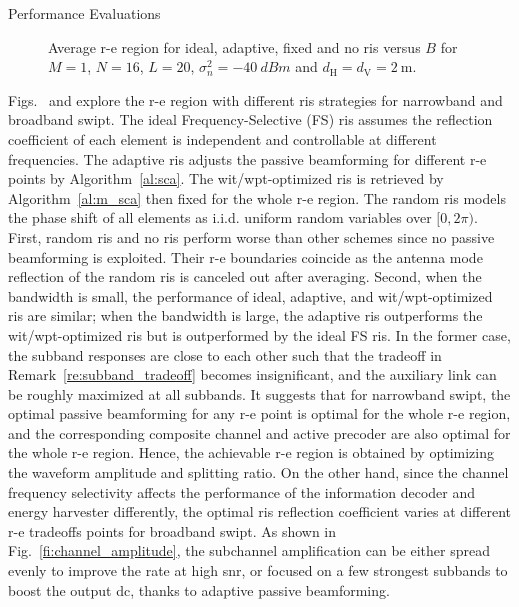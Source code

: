 \begin{section}{Performance Evaluations}
	\begin{figure}[!t]
		\centering
		\subfloat[$B=\qty{1}{\MHz}$\label{fi:re_irs_1mhz}]{
			\resizebox{0.45\columnwidth}{!}{
				
			}
		}
		\subfloat[$B=\qty{10}{\MHz}$\label{fi:re_irs_10mhz}]{
			\resizebox{0.45\columnwidth}{!}{
				
			}
		}
		\caption{Average \gls{r-e} region for ideal, adaptive, fixed and no \gls{ris} versus $B$ for $M=1$, $N=16$, $L=20$, $\sigma_n^2=\qty{-40}{dBm}$ and $d_{\mathrm{H}}=d_{\mathrm{V}}=\qty{2}{\meter}$.}
	\end{figure}

	Figs.~ and  explore the \gls{r-e} region with different \gls{ris} strategies for narrowband and broadband \gls{swipt}. The ideal Frequency-Selective (FS) \gls{ris} assumes the reflection coefficient of each element is independent and controllable at different frequencies. The adaptive \gls{ris} adjusts the passive beamforming for different \gls{r-e} points by Algorithm~\ref{al:sca}. The \gls{wit}/\gls{wpt}-optimized \gls{ris} is retrieved by Algorithm~\ref{al:m_sca} then fixed for the whole \gls{r-e} region. The random \gls{ris} models the phase shift of all elements as i.i.d. uniform random variables over $[0, 2\pi)$. First, random \gls{ris} and no \gls{ris} perform worse than other schemes since no passive beamforming is exploited. Their \gls{r-e} boundaries coincide as the antenna mode reflection of the random \gls{ris} is canceled out after averaging. Second, when the bandwidth is small, the performance of ideal, adaptive, and \gls{wit}/\gls{wpt}-optimized \gls{ris} are similar; when the bandwidth is large, the adaptive \gls{ris} outperforms the \gls{wit}/\gls{wpt}-optimized \gls{ris} but is outperformed by the ideal FS \gls{ris}. In the former case, the subband responses are close to each other such that the tradeoff in Remark~\ref{re:subband_tradeoff} becomes insignificant, and the auxiliary link can be roughly maximized at all subbands. It suggests that for narrowband \gls{swipt}, the optimal passive beamforming for any \gls{r-e} point is optimal for the whole \gls{r-e} region, and the corresponding composite channel and active precoder are also optimal for the whole \gls{r-e} region. Hence, the achievable \gls{r-e} region is obtained by optimizing the waveform amplitude and splitting ratio. On the other hand, since the channel frequency selectivity affects the performance of the information decoder and energy harvester differently, the optimal \gls{ris} reflection coefficient varies at different \gls{r-e} tradeoffs points for broadband \gls{swipt}. As shown in Fig.~\ref{fi:channel_amplitude}, the subchannel amplification can be either spread evenly to improve the rate at high \gls{snr}, or focused on a few strongest subbands to boost the output \gls{dc}, thanks to adaptive passive beamforming.


\end{section}
